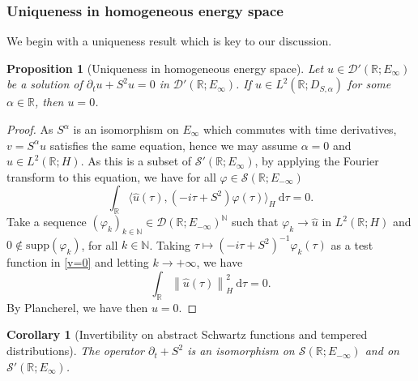 \documentclass[11pt, letterpaper]{amsart}
\newtheorem{cor}[thm]{Corollary}
\newtheorem{prop}[thm]{Proposition}
\theoremstyle{definition}
\theoremstyle{remark}
\numberwithin{equation}{section}
\begin{document}
\subsubsection{Uniqueness in homogeneous energy space}
We begin with a uniqueness result which is key to our discussion. 
\begin{prop}[Uniqueness in homogeneous energy space]\label{Unicité}
    Let $u \in \mathcal{D}'(\mathbb{R}; E_\infty)$ be a solution of $\partial_t u + S^2 u =0$ in $\mathcal{D}'(\mathbb{R};E_\infty)$. If $u \in L^2(\mathbb{R};D_{S,\alpha})$ for some $\alpha \in \mathbb{R}$, then $u=0$.
\end{prop}
\begin{proof} 
As $S^\alpha$ is an isomorphism on $E_\infty$ which commutes with time derivatives, $v=S^\alpha u$ satisfies the same equation, hence we may assume $\alpha=0$ and $u\in L^2(\mathbb{R};H)$. As this is a subset of $ \mathcal{S}'(\mathbb{R};E_\infty)$, by applying the Fourier transform to this equation, we have for all $\varphi \in \mathcal{S}(\mathbb{R};E_{-\infty})$
\begin{equation}\label{v=0}
    \int_\mathbb{R} \langle \hat{u}(\tau ), (- i \tau+S^2 ) \varphi(\tau) \rangle_H \ \mathrm{d}\tau =0.
\end{equation}
Take a sequence $(\varphi_k)_{k \in \mathbb{N}} \in \mathcal{D}(\mathbb{R};E_{-\infty})^\mathbb{N}$ such that $\varphi_k \underset{}{\rightarrow}  \hat{u}$ in $L^2(\mathbb{R};H)$ and $0 \notin \mathrm{supp}(\varphi_k)$, for all $k \in \mathbb{N}$.
Taking $\tau \mapsto (-{i}\tau+S^2)^{-1}\varphi_k(\tau)$ as a test function in \eqref{v=0} and letting $k \to +\infty$, we have
\begin{equation*}
    \int_\mathbb{R}\left \| \hat{u}(\tau) \right \|_H^2 \ \mathrm{d}\tau =0 .
\end{equation*}
By Plancherel, we have then $u=0$.
\end{proof} 
\begin{cor}[Invertibility on abstract Schwartz functions and tempered distributions]\label{cor:iso} The operator $\partial_t  + S^2$ is an isomorphism on $\mathcal{S}(\mathbb{R};E_{-\infty})$  and on $\mathcal{S}'(\mathbb{R};E_{\infty})$.
\end{cor}
\end{document}
